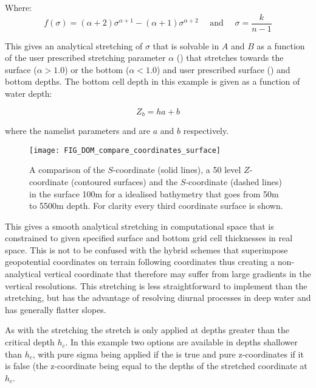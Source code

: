 \documentclass[NEMO_book]{subfiles}
\begin{document}
Where:
\begin{equation} \label{DOM_gamma}
f\left(\sigma\right)=\left(\alpha+2\right)\sigma^{\alpha+1}-\left(\alpha+1\right)\sigma^{\alpha+2} \quad \text{ and } \quad \sigma = \frac{k}{n-1} 
\end{equation}

This gives an analytical stretching of $\sigma$ that is solvable in $A$ and $B$ as a function of the user prescribed stretching parameter $\alpha$ () that stretches towards the surface ($\alpha > 1.0$) or the bottom ($\alpha < 1.0$) and user prescribed surface () and bottom depths. The bottom cell depth in this example is given as a function of water depth:

\begin{equation} \label{DOM_zb}
Z_b= h a + b
\end{equation}

where the namelist parameters  and  are $a$ and $b$ respectively.

\begin{figure}[!ht]
   \texttt{[image: FIG\_DOM\_compare\_coordinates\_surface]}
        \caption{A comparison of the \citet{Song_Haidvogel_JCP94} $S$-coordinate (solid lines), a 50 level $Z$-coordinate (contoured surfaces) and the \citet{Siddorn_Furner_OM12} $S$-coordinate (dashed lines) in the surface 100m for a idealised bathymetry that goes from 50m to 5500m depth. For clarity every third coordinate surface is shown.}
    \label{fig_compare_coordinates_surface}
\end{figure}

This gives a smooth analytical stretching in computational space that is constrained to given specified surface and bottom grid cell thicknesses in real space. This is not to be confused with the hybrid schemes that superimpose geopotential coordinates on terrain following coordinates thus creating a non-analytical vertical coordinate that therefore may suffer from large gradients in the vertical resolutions. This stretching is less straightforward to implement than the \citet{Song_Haidvogel_JCP94} stretching, but has the advantage of resolving diurnal processes in deep water and has generally flatter slopes.

As with the \citet{Song_Haidvogel_JCP94} stretching the stretch is only applied at depths greater than the critical depth $h_c$. In this example two options are available in depths shallower than $h_c$, with pure sigma being applied if the  is true and pure z-coordinates if it is false (the z-coordinate being equal to the depths of the stretched coordinate at $h_c$.
\end{document}
